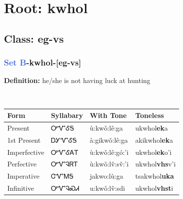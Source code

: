 \needspace{4in}
\section*{Root: kwhol}
\nopagebreak
{}
\needspace{3in}
\subsection*{Class: eg-vs}
\nopagebreak
\needspace{2in}
\subsubsection*{\textcolor{RoyalBlue}{Set B}{-}\textbf{kwhol}{-}[eg-vs]}
\nopagebreak
\textbf{Definition: } he/she is not having luck at hunting
\\[0.5em]
\begin{tabularx}{\textwidth}{l X X X}%
\toprule%
\textbf{Form}&\textbf{Syllabary}&\textbf{With Tone}&\textbf{Toneless}\\%
\midrule%
Present&ᎤᏉᎴᎦ&ù:kwǒ:lê:ga&ukwhol\textbf{ek}a\\%
1st Present&ᎠᎩᏉᎴᎦ&à:gikwǒ:lê:ga&akikwhol\textbf{ek}a\\%
Imperfective&ᎤᏉᎴᎪᎢ&ù:kwǒ:lê:gó:’i&ukwhol\textbf{ek}o'i\\%
Perfective&ᎤᏉᎸᏒᎢ&ù:kwǒ:lv̂:sv̌:’i&ukwhol\textbf{vhs}v'i\\%
Imperative&ᏣᏉᎷᎦ&jakwo:lù:ga&tsakwhol\textbf{uka}\\%
Infinitive&ᎤᏉᎸᏍᏗ&u:kwǒ:lv̂:sdi&ukwhol\textbf{vhst}i\\%
\bottomrule%
\end{tabularx}
\\[1em]